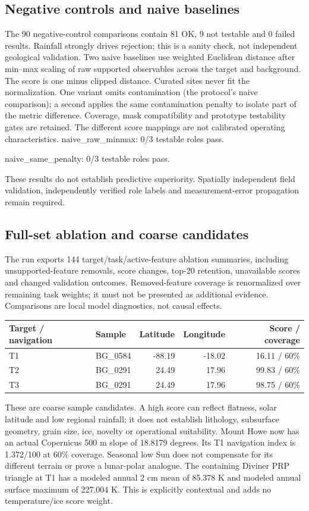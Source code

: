 \documentclass[10pt,a4paper]{article}
\begin{document}
\subsection{Negative controls and naive baselines}
The 90 negative-control comparisons contain 81 OK, 9 not testable and 0 failed results. Rainfall strongly drives rejection; this is a sanity check, not independent geological validation.
Two naive baselines use weighted Euclidean distance after min--max scaling
of raw supported observables across the target and background. The score is
one minus clipped distance. Curated sites never fit the normalization. One
variant omits contamination (the protocol's naive comparison); a second applies
the same contamination penalty to isolate part of the metric difference.
Coverage, mask compatibility and prototype testability gates are retained.
The different score mappings are not calibrated operating characteristics.
naive\_raw\_minmax: 0/3 testable roles pass.

naive\_same\_penalty: 0/3 testable roles pass.

These results do not establish predictive superiority. Spatially independent
field validation, independently verified role labels and measurement-error
propagation remain required.
\subsection{Full-set ablation and coarse candidates}
The run exports 144 target/task/active-feature ablation summaries, including unsupported-feature removals, score changes, top-20 retention, unavailable scores and changed validation outcomes. Removed-feature coverage is renormalized over remaining task weights; it must not be presented as additional evidence. Comparisons are local model diagnostics, not causal effects.
\begin{center}\begin{tabular}{llrrr}\toprule Target / navigation & Sample & Latitude & Longitude & Score / coverage\\\midrule
T1 & BG\_0584 & -88.19 & -18.02 & 16.11 / 60\% \\
T2 & BG\_0291 & 24.49 & 17.96 & 99.83 / 60\% \\
T3 & BG\_0291 & 24.49 & 17.96 & 98.75 / 60\% \\
\bottomrule\end{tabular}\end{center}
These are coarse sample candidates. A high score can reflect flatness,
solar latitude and low regional rainfall; it does not establish lithology,
subsurface geometry, grain size, ice, novelty or operational suitability.
Mount Howe now has an actual Copernicus 500 m slope of 18.8179 degrees. Its T1 navigation index is 1.372/100 at 60\% coverage. Seasonal low Sun does not compensate for its different terrain or prove a lunar-polar analogue.
The containing Diviner PRP triangle at T1 has a modeled annual 2 cm mean of 85.378 K and modeled annual surface maximum of 227.004 K. This is explicitly contextual and adds no temperature/ice score weight.
\end{document}
